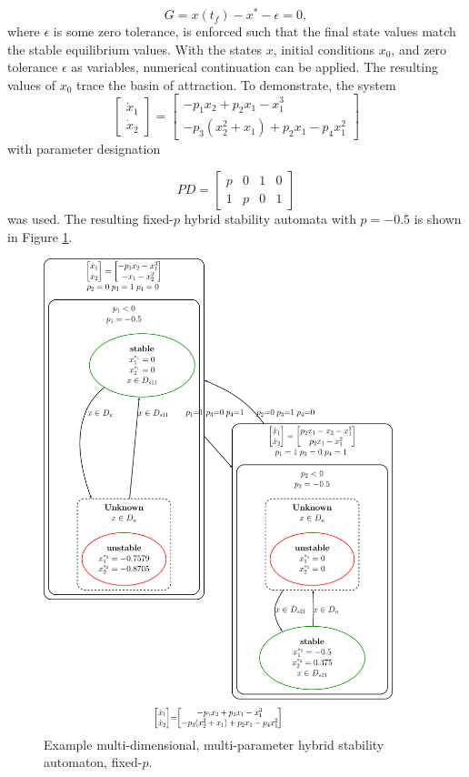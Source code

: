 \documentclass[12pt]{article}
\begin{document}
\begin{equation}
\label{constraints}
G=x\left(t_f\right)-x^*-\epsilon=0,
\end{equation}
where $\epsilon$ is some zero tolerance, is enforced such that the final state values match the stable equilibrium values. With the states $x$, initial conditions $x_0$, and zero tolerance $\epsilon$ as variables, numerical continuation can be applied. The resulting values of $x_0$ trace the basin of attraction. To demonstrate, the system
\begin{equation}
\begin{bmatrix}
\dot{x}_1 \\ \dot{x}_2
\end{bmatrix}
=
\begin{bmatrix}
-p_1x_2+p_2x_1-x_1^3 \\ -p_3\left(x_2^2+x_1\right)+p_2x_1-p_4x_1^2
\end{bmatrix}
\end{equation}
with parameter designation 

\begin{equation}
PD=\begin{bmatrix}
    p & 0 & 1 & 0\\
    1 & p & 0 & 1
\end{bmatrix}
\end{equation}
was used. The resulting fixed-$p$ hybrid stability automata with $p=-0.5$ is shown in Figure \ref{MDMP_graph2}.

\begin{figure}[H]
\begin{center}
\includegraphics[width=4in]{MDMP_graph2.pdf}
\caption{Example multi-dimensional, multi-parameter hybrid stability automaton, fixed-$p$.}
\label{MDMP_graph2}
\end{center}
\end{figure}
\end{document}
